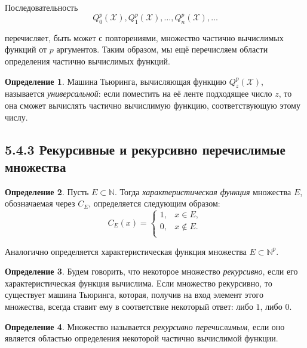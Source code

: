 \documentclass[a4paper, 12pt]{article}  %
\theoremstyle{definition}
\newtheorem*{theorem}{Теорема}
\newtheorem*{definition}{Определение}
\begin{document}
		Последовательность
		$$Q^p_0(\mathscr{X}), Q^p_1(\mathscr{X}), \dots, Q^p_n(\mathscr{X}), \dots$$
		
		перечисляет, быть может с повторениями, множество частично вычислимых функций от $p$ аргументов.
		Таким образом, мы ещё перечисляем области определения частично вычислимых функций.
		
		\begin{definition}
			Машина Тьюринга, вычисляющая функцию $Q^p_z(\mathscr{X})$, называется \textit{универсальной}:
			если поместить на её ленте подходящее число $z$, то она сможет вычислять частично вычислимую
			функцию, соответствующую этому числу.
		\end{definition}
		
		
		
		
	\subsection*{5.4.3 Рекурсивные и рекурсивно перечислимые множества}
	
		\begin{definition}
			Пусть $E \subset \mathbb{N}$. Тогда \textit{характеристическая функция} множества $E$,
			обозначаемая через $C_E$, определяется следующим образом:
			\[
				C_E(x) =  
					\begin{cases}
						1, & x \in E, \\
						0, & x \notin E. \\
					\end{cases}
			\]			
			
			Аналогично определяется характеристическая функция множества $E \subset \mathbb{N}^p$.
		\end{definition}
	
		\begin{definition}
			Будем говорить, что некоторое множество \textit{рекурсивно}, если его характеристическая
			функция вычислима. Если множество рекурсивно, то существует машина Тьюринга, которая, получив
			на вход элемент этого множества, всегда ставит ему в соответствие некоторый ответ: либо $1$,
			либо $0$.
		\end{definition}
	
		\begin{definition}
			Множество называется \textit{рекурсивно перечислимым}, если оно является областью определения
			некоторой частично вычислимой функции.
		\end{definition}
	
\end{document}
